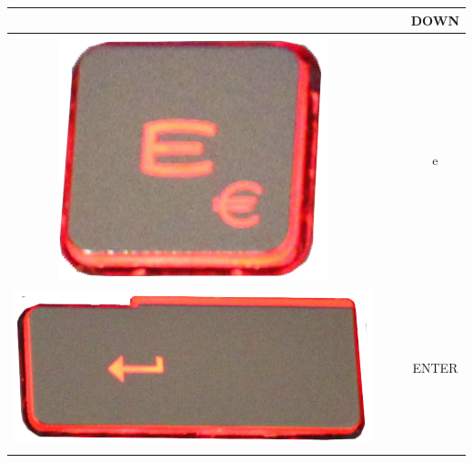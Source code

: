 \begin{longtable}{cccc}
\begin{minipage}[c]{.3\textwidth}
\vspace{0.2cm}
\end{minipage} & & & DOWN\\
\hline
\begin{minipage}[c]{.3\textwidth}
\vspace{0.2cm}
\includegraphics[scale=0.1]{Images/KeyMapping/e}
\vspace{0.2cm}
\end{minipage} & & & e\\
\hline
\begin{minipage}[c]{.3\textwidth}
\vspace{0.2cm}
\includegraphics[scale=0.1]{Images/KeyMapping/ENTER}
\vspace{0.2cm}
\end{minipage} & & & ENTER\\
\hline
\begin{minipage}[c]{.3\textwidth}
\vspace{0.2cm}

\end{minipage}
\end{longtable}
